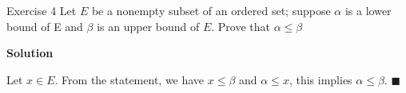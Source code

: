\documentclass[12pt, a4paper]{article}
\begin{document}
\thispagestyle{fancy}

\begin{exercisebox}{Exercise 4}
Let $E$ be a nonempty subset of an ordered set; suppose $\alpha$ is a lower bound of E and $\beta$ is an upper bound of $E$. Prove that $\alpha \leq \beta$
\end{exercisebox}

\textbf{Solution}

Let $ x \in E$. From the statement, we have $x\leq \beta$ and $\alpha \leq x$, this implies $\alpha \leq \beta$. $\blacksquare$ 
\end{document}
